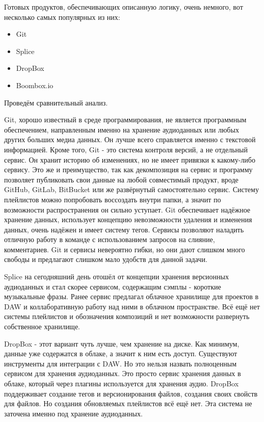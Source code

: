 \documentclass[14pt]{extarticle}
\begin{document}
Готовых продуктов, обеспечивающих описанную логику, очень немного, вот несколько самых популярных из них:

\begin{itemize}[label=$\bullet$]
	\item Git
	\item Splice
	\item DropBox
	\item Boombox.io
\end{itemize}

Проведём сравнительный анализ.

Git, хорошо известный в среде программирования, не является программным обеспечением, направленным именно на хранение
аудиоданных или любых других больших медиа данных. Он лучше всего справляется именно с текстовой информацией. Кроме того, Git - это система контроля версий, 
а не отдельный сервис. Он хранит историю об изменениях, но не имеет привязки к какому-либо сервису. Это же и преимущество, так как
декомпозиция на сервис и программу позволяет публиковать свои данные на любой совместимый продукт, вроде GitHub, GitLab, BitBucket или же
развёрнутый самостоятельно сервис. Систему плейлистов можно попробовать воссоздать внутри папки, а значит по возможности распространения он сильно уступает. 
Git обеспечивает надёжное хранение данных, использует концепцию невозможности удаления и изменения данных, очень надёжен и имеет систему тегов.
Сервисы позволяют наладить отличную работу в команде с использованием запросов на слияние, комментариев. Git и сервисы невероятно гибки, 
но они дают слишком много свободы и предлагают слишком мало удобств для данной задачи.

Splice на сегодняшний день отошёл от концепции хранения версионных аудиоданных и стал скорее сервисом, содержащим сэмплы - короткие 
музыкальные фразы. Ранее сервис предлагал облачное хранилище для проектов в DAW и коллаборативную работу над ними в облачном пространстве. Всё 
ещё нет системы плейлистов и обозначения композиций и нет возможности развернуть собственное хранилище.

DropBox - этот вариант чуть лучше, чем хранение на диске. Как минимум, данные уже содержатся в облаке, а значит к ним есть доступ. 
Существуют инструменты для интеграции с DAW. Но это нельзя назвать полноценным сервисом для хранения аудиоданных. Это просто сервис 
хранения данных в облаке, который через плагины используется для хранения аудио. DropBox поддерживает создание тегов и версионирования 
файлов, создания своих свойств для файлов. Но создания обновляемых плейлистов всё ещё нет. Эта система не заточена именно под 
хранение аудиоданных.
\end{document}
